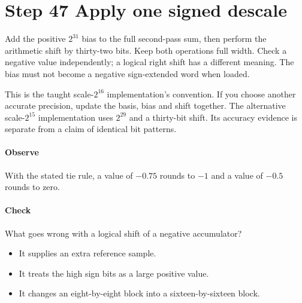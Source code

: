 \section{Step 47 Apply one signed descale}\label{h263-transform-s07}
Add the positive $2^{31}$ bias to the full second-pass sum, then perform the
arithmetic shift by thirty-two bits. Keep both operations full width. Check a
negative value independently; a logical right shift has a different meaning.
The bias must not become a negative sign-extended word when loaded.

This is the taught scale-$2^{16}$ implementation's convention. If you choose
another accurate precision, update the basis, bias and shift together. The
alternative scale-$2^{15}$ implementation uses $2^{29}$ and a thirty-bit shift.
Its accuracy evidence is separate from a claim of identical bit patterns.

\paragraph{Observe} With the stated tie rule, a value of $-0.75$ rounds to $-1$
and a value of $-0.5$ rounds to zero.
\paragraph{Check} What goes wrong with a logical shift of a negative accumulator?
\begin{itemize}
  \item[A.] It supplies an extra reference sample.
  \item[B.] It treats the high sign bits as a large positive value.
  \item[C.] It changes an eight-by-eight block into a sixteen-by-sixteen block.
\end{itemize}
